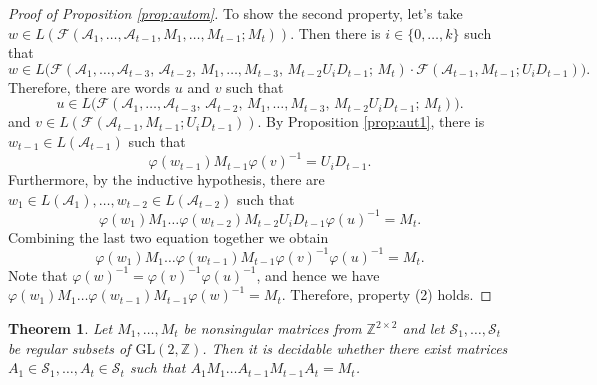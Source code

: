 \documentclass[fontsize=11pt,DIV=13,paper=letter]{scrartcl}
\newtheorem{theorem}{Theorem}\newtheorem{proposition}[theorem]{Proposition}
\theoremstyle{definition}
\newcommand{\A}{\mathcal{A}}
\newcommand{\Z}{\mathbb{Z}}
\newcommand{\F}{\mathcal{F}}
\newcommand{\s}{\mathcal{S}}
\newcommand{\GL}{\mathrm{GL}(2,\Z)}
\renewcommand{\phi}{\varphi}
\begin{document}
\begin{proof}[Proof of Proposition \ref{prop:autom}]
To show the second property, let's take $w\in L(\F(\A_1,\dots,\A_{t-1},M_1,\dots,M_{t-1};M_t))$. Then there is $i\in \{0,\dots,k\}$ such that
\[
w\in L\Big(\F(\A_1,\dots,\A_{t-3},\,\A_{t-2},\,M_1,\dots,M_{t-3},\,M_{t-2}U_iD_{t-1};\,M_t)\cdot \F(\A_{t-1},M_{t-1};U_iD_{t-1})\Big).
\]
Therefore, there are words $u$ and $v$ such that
\[
u\in L\Big(\F(\A_1,\dots,\A_{t-3},\,\A_{t-2},\,M_1,\dots,M_{t-3},\,M_{t-2}U_iD_{t-1};\,M_t)\Big).
\]
and $v\in L(\F(\A_{t-1},M_{t-1};U_iD_{t-1}))$. By Proposition \ref{prop:aut1}, there is $w_{t-1}\in L(\A_{t-1})$ such that
\[
\phi(w_{t-1})M_{t-1}\phi(v)^{-1} =U_iD_{t-1}.
\]
Furthermore, by the inductive hypothesis, there are $w_1\in L(\A_1),\dots,w_{t-2}\in L(\A_{t-2})$ such that
\[
\phi(w_1)M_1\dots\phi(w_{t-2})M_{t-2}U_iD_{t-1}\phi(u)^{-1} =M_t.
\]
Combining the last two equation together we obtain
\[
\phi(w_1)M_1\dots\phi(w_{t-1})M_{t-1}\phi(v)^{-1}\phi(u)^{-1}=M_t.
\]
Note that $\phi(w)^{-1}=\phi(v)^{-1}\phi(u)^{-1}$, and hence we have $\phi(w_1)M_1\dots\phi(w_{t-1})M_{t-1}\phi(w)^{-1}=M_t$.  Therefore, property (2) holds.

\end{proof}

\begin{theorem}\label{thm:diag}
Let $M_1,\dots,M_t$ be nonsingular matrices from $\Z^{2\times 2}$ and let $\s_1,\dots,\s_t$ be regular subsets of $\GL$. Then it is decidable whether there exist matrices $A_1\in \s_1,\dots,A_t\in \s_t$ such that $A_1M_1\dots A_{t-1}M_{t-1}A_t= M_t$.
\end{theorem}
\end{document}
